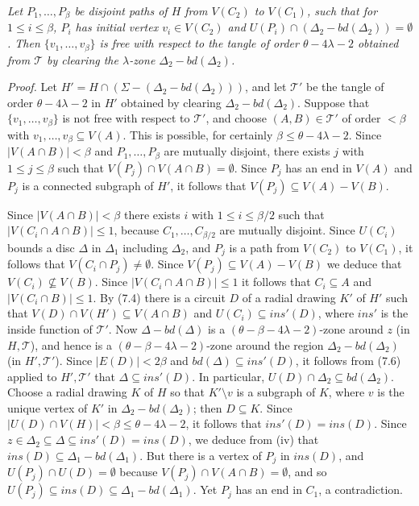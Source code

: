 \textit{Let $P_1, \dots, P_\beta$ be disjoint paths of $H$ from $V(C_2)$ to $V(C_1)$, such that for $1 \le i \le \beta$, $P_i$ has initial vertex $v_i \in V(C_2)$ and $U(P_i) \cap (\Delta_2 - bd(\Delta_2)) = \emptyset$. Then $\{v_1, \dots, v_\beta\}$ is free with respect to the tangle of order $\theta - 4\lambda - 2$ obtained from $\mathscr{T}$ by clearing the $\lambda$-zone $\Delta_2 - bd(\Delta_2)$.}

\textit{Proof.} Let $H' = H \cap (\Sigma - (\Delta_2 - bd(\Delta_2)))$, and let $\mathscr{T}'$ be the tangle of order $\theta - 4\lambda - 2$ in $H'$ obtained by clearing $\Delta_2 - bd(\Delta_2)$. Suppose that $\{v_1, \dots, v_\beta\}$ is not free with respect to $\mathscr{T}'$, and choose $(A, B) \in \mathscr{T}'$ of order $< \beta$ with $v_1, \dots, v_\beta \subseteq V(A)$. This is possible, for certainly $\beta \le \theta - 4\lambda - 2$. Since $|V(A \cap B)| < \beta$ and $P_1, \dots, P_\beta$ are mutually disjoint, there exists $j$ with $1 \le j \le \beta$ such that $V(P_j) \cap V(A \cap B) = \emptyset$. Since $P_j$ has an end in $V(A)$ and $P_j$ is a connected subgraph of $H'$, it follows that $V(P_j) \subseteq V(A) - V(B)$.

Since $|V(A \cap B)| < \beta$ there exists $i$ with $1 \le i \le \beta/2$ such that $|V(C_i \cap A \cap B)| \le 1$, because $C_1, \dots, C_{\beta/2}$ are mutually disjoint. Since $U(C_i)$ bounds a disc $\Delta$ in $\Delta_1$ including $\Delta_2$, and $P_j$ is a path from $V(C_2)$ to $V(C_1)$, it follows that $V(C_i \cap P_j) \ne \emptyset$. Since $V(P_j) \subseteq V(A) - V(B)$ we deduce that $V(C_i) \not\subseteq V(B)$. Since $|V(C_i \cap A \cap B)| \le 1$ it follows that $C_i \subseteq A$ and $|V(C_i \cap B)| \le 1$. By (7.4) there is a circuit $D$ of a radial drawing $K'$ of $H'$ such that $V(D) \cap V(H') \subseteq V(A \cap B)$ and $U(C_i) \subseteq ins'(D)$, where $ins'$ is the inside function of $\mathscr{T}'$. Now $\Delta - bd(\Delta)$ is a $(\theta - \beta - 4\lambda - 2)$-zone around $z$ (in $H, \mathscr{T}$), and hence is a $(\theta - \beta - 4\lambda - 2)$-zone around the region $\Delta_2 - bd(\Delta_2)$ (in $H', \mathscr{T}'$). Since $|E(D)| < 2\beta$ and $bd(\Delta) \subseteq ins'(D)$, it follows from (7.6) applied to $H', \mathscr{T}'$ that $\Delta \subseteq ins'(D)$. In particular, $U(D) \cap \Delta_2 \subseteq bd(\Delta_2)$. Choose a radial drawing $K$ of $H$ so that $K' \setminus v$ is a subgraph of $K$, where $v$ is the unique vertex of $K'$ in $\Delta_2 - bd(\Delta_2)$; then $D \subseteq K$. Since $|U(D) \cap V(H)| < \beta \le \theta - 4\lambda - 2$, it follows that $ins'(D) = ins(D)$. Since $z \in \Delta_2 \subseteq \Delta \subseteq ins'(D) = ins(D)$, we deduce from (iv) that $ins(D) \subseteq \Delta_1 - bd(\Delta_1)$. But there is a vertex of $P_j$ in $ins(D)$, and $U(P_j) \cap U(D) = \emptyset$ because $V(P_j) \cap V(A \cap B) = \emptyset$, and so $U(P_j) \subseteq ins(D) \subseteq \Delta_1 - bd(\Delta_1)$. Yet $P_j$ has an end in $C_1$, a contradiction.

